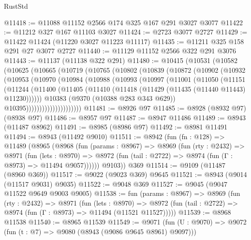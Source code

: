 \begin{lexlean}{RustStd}
\begin{coremodule}
@11418 := @11088 @11152 @2566 @174 @325 @167 @291 @3027 @3077
@11422 := @11212 @327 @167 @11103 @3027
@11424 := @2723 @3077 @2727
@11429 := @11422 @11424 (@11220 @3027 @11223 @11117)
@11435 := @11211 @325 @158 @291 @27 @3077 @2727
@11440 := @11129 @11152 @2566 @322 @291 @3076
@11443 := @11137 (@11138 @322 @291)
@11480 := @10415
    (@10531
      (@10582
        (@10625
          (@10665
            (@10719
              (@10765
                (@10802
                  (@10839
                    (@10872
                      (@10902
                        (@10932
                          (@10953
                            (@10970
                              (@10984
                                (@10988
                                  (@10993
                                    (@10997
                                      (@11001
                                        (@11050
                                          (@11151
                                            (@11244
                                              (@11400
                                                (@11405
                                                  (@11410
                                                    (@11418
                                                      (@11429 (@11435 (@11440 @11443) @11230))))))
                                              @10383
                                              (@9370 (@10388 @283 @343 @629))
                                              @10395)))))))))))))))))))))
@11481 := @8926 @97
@11485 := @8928 (@8932 @97) (@8938 @97)
@11486 := @8957 @97
@11487 := @8947 @11486
@11489 := @8943 (@11487 @8962)
@11491 := @8985 (@8986 @97)
@11492 := @8981 @11491
@11494 := @8943 (@11492 @9010)
@11511 := @8942
    (fun (fn : @128) =>
    @11489
      (@8965
        (@8968
          (fun (params : @8967) =>
          @8969
            (fun (rty : @2432) =>
            @8971
              (fun (lets : @8970) =>
              @8972 (fun (tail : @2722) => @8974 (fun (Γ : @8973) => @11494 @9057))))))
        @9103))
    @369
@11514 := @9109 (@11487 (@8960 @369))
@11517 := @9022 (@9023 @369) @9645
@11521 := @8943 (@9014 (@11517 @9031) @9035)
@11522 := @9048 @369
@11527 := @9045 (@9047 @11522 @9649 @9003 @9005)
@11538 := fun (params : @8967) =>
  @8969
    (fun (rty : @2432) =>
    @8971
      (fun (lets : @8970) =>
      @8972 (fun (tail : @2722) => @8974 (fun (Γ : @8973) => @11494 (@11521 @11527)))))
@11539 := @8968 @11538
@11540 := @8965 @11539
@11549 := @9071 (fun (U : @9070) => @9072 (fun (t : @7) => @9080 (@8943 (@9086 @9645 @8961) @9097)))

\end{coremodule}
\end{lexlean}
